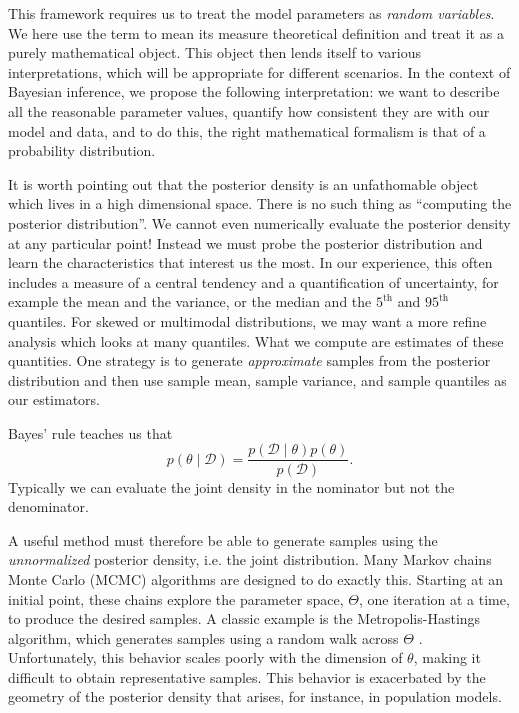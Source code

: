 This framework requires us to treat the model parameters as \textit{random variables}.
We here use the term to mean its measure theoretical definition and treat it as a purely mathematical object.
This object then lends itself to various interpretations, which will be appropriate for different scenarios.
In the context of Bayesian inference, we propose the following interpretation: we want to describe all the reasonable parameter values, quantify how consistent they are with our model and data, and to do this, the right mathematical formalism is that of a probability distribution.

It is worth pointing out that the posterior density is an unfathomable object which lives in a high dimensional space.
There is no such thing as ``computing the posterior distribution''.
We cannot even numerically evaluate the posterior density at any particular point!
Instead we must probe the posterior distribution and learn the characteristics that interest us the most.
In our experience, this often includes a measure of a central tendency and a quantification of uncertainty, for example the mean and the variance, or the median and the $5^\mathrm{th}$ and $95^\mathrm{th}$ quantiles.
For skewed or multimodal distributions, we may want a more refine analysis which looks at many quantiles.
What we compute are estimates of these quantities.
One strategy is to generate \textit{approximate} samples from the posterior distribution and then use sample mean, sample variance, and sample quantiles as our estimators.

Bayes' rule teaches us that
\begin{equation*}
  p(\theta \mid \mathcal D) = \frac{p(\mathcal D \mid \theta) p(\theta)}{p(\mathcal D)}.
\end{equation*}
Typically we can evaluate the joint density in the nominator but not the denominator.

A useful method must therefore be able to generate samples using the \textit{unnormalized} posterior density, i.e. the joint distribution.
Many Markov chains Monte Carlo (MCMC) algorithms are designed to do exactly this.
Starting at an initial point, these chains explore the parameter space, $\Theta$, one iteration at a time, to produce the desired samples.
A classic example is the Metropolis-Hastings algorithm, which generates samples using a random walk across $\Theta$ \cite{Metropolis:1953; Hastings:1970}.
Unfortunately, this behavior scales poorly with the dimension of $\theta$, making it difficult to obtain representative samples.
This behavior is exacerbated by the geometry of the posterior density that arises, for instance, in population models.

